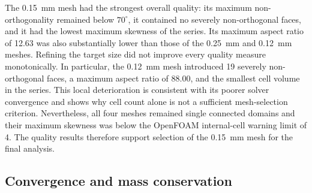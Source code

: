 \documentclass[11pt,a4paper]{article}
\begin{document}
\begin{table}[htbp]
  \centering
  \caption{Postoperative HXT mesh-quality metrics reported by
  \texttt{checkMesh}. The minimum cell volumes are given after conversion of
  the geometry from millimetres to metres.}
  \label{tab:mesh_quality}
\end{table}

The \SI{0.15}{\milli\metre} mesh had the strongest overall quality: its maximum
non-orthogonality remained below $70^\circ$, it contained no severely
non-orthogonal faces, and it had the lowest maximum skewness of the series. Its
maximum aspect ratio of 12.63 was also substantially lower than those of the
\SI{0.25}{\milli\metre} and \SI{0.12}{\milli\metre} meshes. Refining the target
size did not improve every quality measure monotonically. In particular, the
\SI{0.12}{\milli\metre} mesh introduced 19 severely non-orthogonal faces, a
maximum aspect ratio of 88.00, and the smallest cell volume in the series. This
local deterioration is consistent with its poorer solver convergence and shows
why cell count alone is not a sufficient mesh-selection criterion. Nevertheless,
all four meshes remained single connected domains and their maximum skewness was
below the OpenFOAM internal-cell warning limit of 4. The quality results therefore
support selection of the \SI{0.15}{\milli\metre} mesh for the final analysis.

\subsection{Convergence and mass conservation}
\end{document}
